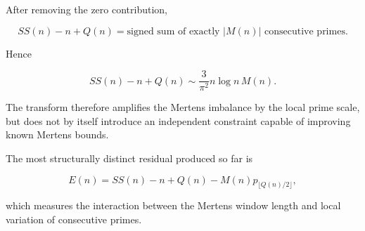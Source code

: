 \documentclass[11pt]{amsart}
\newcommand{\Mert}{M}
\newcommand{\Sq}{Q}
\begin{document}
After removing the zero contribution,

\[
\boxed{
SS(n)-n+\Sq(n)
=
\text{signed sum of exactly }|\Mert(n)|\text{ consecutive primes}.
}
\]

Hence

\[
\boxed{
SS(n)-n+\Sq(n)
\sim
\frac{3}{\pi^2}n\log n\,\Mert(n).
}
\]

The transform therefore amplifies the Mertens imbalance by the local prime scale, but does not by itself introduce an independent constraint capable of improving known Mertens bounds.

The most structurally distinct residual produced so far is

\[
\boxed{
E(n)
=
SS(n)-n+\Sq(n)
-
\Mert(n)p_{\lfloor \Sq(n)/2\rfloor},
}
\]

which measures the interaction between the Mertens window length and local variation of consecutive primes.
\end{document}

